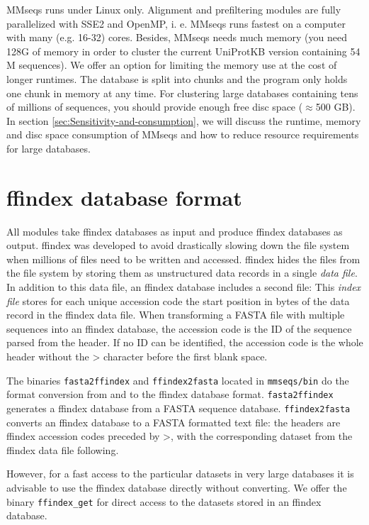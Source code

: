 \documentclass[11pt,a4paper]{report}
\begin{document}
MMseqs runs under Linux only. Alignment and prefiltering modules are
fully parallelized with SSE2 and OpenMP, i. e. MMseqs runs fastest
on a computer with many (e.g. 16-32) cores. Besides, MMseqs needs
much memory (you need 128G of memory in order to cluster the current
UniProtKB version containing 54\,M sequences). We offer an option
for limiting the memory use at the cost of longer runtimes. The database
is split into chunks and the program only holds one chunk in memory
at any time. For clustering large databases containing tens of millions
of sequences, you should provide enough free disc space ($\approx$500
GB). In section \ref{sec:Sensitivity-and-consumption}, we will discuss
the runtime, memory and disc space consumption of MMseqs and how to
reduce resource requirements for large databases.


\section{ffindex database format}

All modules take ffindex databases as input and produce ffindex databases
as output. ffindex was developed to avoid drastically slowing down
the file system when millions of files need to be written and accessed.
ffindex hides the files from the file system by storing them as unstructured
data records in a single \emph{data file}. In addition to this data
file, an ffindex database includes a second file: This \emph{index
file }stores for each unique accession code the start position in
bytes of the data record in the ffindex data file. When transforming
a FASTA file with multiple sequences into an ffindex database, the
accession code is the ID of the sequence parsed from the header. If
no ID can be identified, the accession code is the whole header without
the > character before the first blank space.

The binaries \texttt{fasta2ffindex} and \texttt{ffindex2fasta} located
in \texttt{mmseqs/bin} do the format conversion from and to the ffindex
database format. \texttt{fasta2ffindex} generates a ffindex database
from a FASTA sequence database. \texttt{ffindex2fasta} converts an
ffindex database to a FASTA formatted text file: the headers are ffindex
accession codes preceded by >, with the corresponding dataset from
the ffindex data file following.

However, for a fast access to the particular datasets in very large
databases it is advisable to use the ffindex database directly without
converting. We offer the binary \texttt{ffindex\_get} for direct access
to the datasets stored in an ffindex database.
\end{document}
